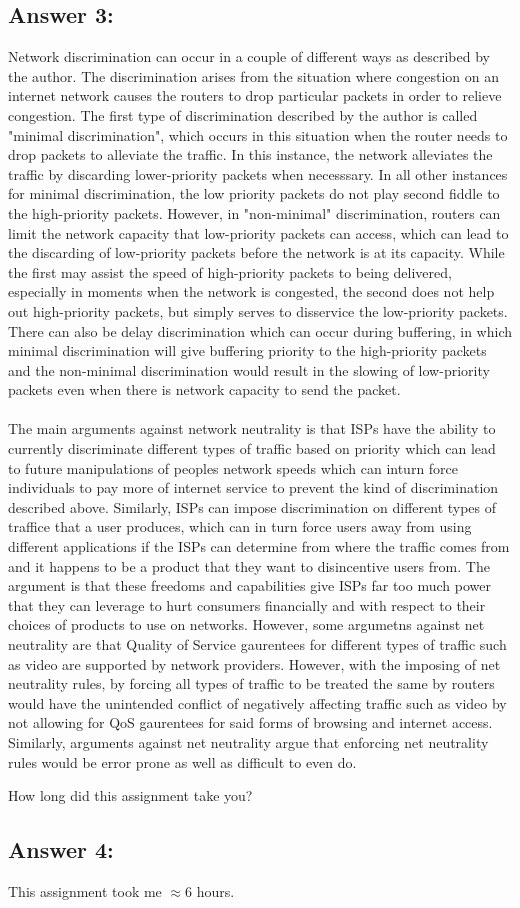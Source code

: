 \documentclass[10pt]{article}
\newenvironment{problem}[2][Problem]{\begin{trivlist}
\item[\hskip \labelsep {\bfseries #1}\hskip \labelsep {\bfseries #2.}]}{\end{trivlist}}
\begin{document}
\subsection*{Answer 3:}
Network discrimination can occur in a couple of different ways as described by the author. The discrimination arises from the situation where congestion on an internet network causes the routers to drop particular packets in order to relieve congestion. The first type of discrimination described by the author is called "minimal discrimination", which occurs in this situation when the router needs to drop packets to alleviate the traffic. In this instance, the network alleviates the traffic by discarding lower-priority packets when necesssary. In all other instances for minimal discrimination, the low priority packets do not 
play second fiddle to the high-priority packets. However, in "non-minimal" discrimination, routers can limit the network capacity that low-priority packets can access, which can lead to the discarding of low-priority packets before the network is at its capacity. While the first may assist the speed of high-priority packets to being delivered, especially in moments when the network is congested, the second does not help out high-priority packets, but simply serves to disservice the low-priority packets. There can also be delay discrimination which can occur during buffering, in which minimal discrimination will give buffering priority to the high-priority packets
and the non-minimal discrimination would result in the slowing of low-priority packets even when there is network capacity to send the packet.
\\\\
The main arguments against network neutrality is that ISPs have the ability to currently discriminate different types of traffic based on priority which can lead to future manipulations of peoples network speeds which can inturn force individuals to pay more of internet service to prevent the kind of discrimination described above. Similarly, ISPs can impose discrimination on different types of traffice that a user produces, which can in turn force users away from using different applications if the ISPs can determine from where the traffic comes from and it happens to be a product that they want to disincentive users from. The argument is that
these freedoms and capabilities give ISPs far too much power that they can leverage to hurt consumers financially and with respect to their choices of products to use on networks. However, some argumetns against net neutrality are that Quality of Service gaurentees for different types of traffic such as video are supported by network providers. However, with the imposing of net neutrality rules, by forcing all types of traffic to be treated the same by routers would have the unintended conflict of negatively affecting traffic such as video by not allowing for QoS gaurentees for said forms of browsing and internet access. Similarly, arguments against 
net neutrality argue that enforcing net neutrality rules would be error prone as well as difficult to even do.

\begin{problem}{4}
How long did this assignment take you?
\end{problem}
\subsection*{Answer 4:}
This assignment took me $\approx 6$ hours.
\end{document}
